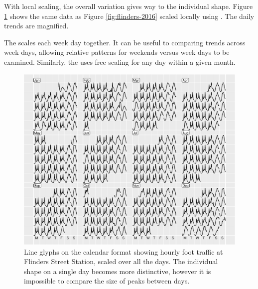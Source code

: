 \documentclass[article]{jss}
\theoremstyle{definition}
\theoremstyle{definition}
\theoremstyle{definition}
\theoremstyle{remark}
\begin{document}
With local scaling, the overall variation gives way to the individual
shape. Figure \ref{fig:flinders-free} shows the same data as Figure
\ref{fig:flinders-2016} scaled locally using . The
daily trends are magnified.

The  scales each week day together. It can be useful to
comparing trends across week days, allowing relative patterns for
weekends versus week days to be examined. Similarly, the
 uses free scaling for any day within a given month.

\begin{CodeChunk}
\begin{figure}

{\centering \includegraphics[width=\textwidth]{figure/flinders-free-1} 

}

\caption[Line glyphs on the calendar format showing
hourly foot traffic at Flinders Street Station, scaled over all the
days. The individual shape on a single day becomes more distinctive,
however it is impossible to compare the size of peaks between days.]{Line glyphs on the calendar format showing
hourly foot traffic at Flinders Street Station, scaled over all the
days. The individual shape on a single day becomes more distinctive,
however it is impossible to compare the size of peaks between days.}\label{fig:flinders-free}
\end{figure}
\end{CodeChunk}
\end{document}

